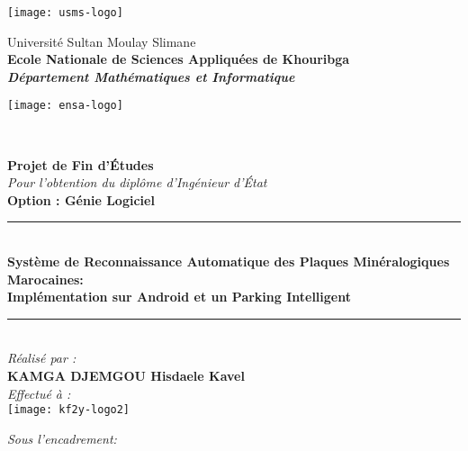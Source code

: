 \begin{titlepage}
\begin{minipage}{2cm}
	\begin{flushleft}
		\texttt{[image: usms-logo]}
	\end{flushleft}
\end{minipage}\hfill
\begin{minipage}{12cm}
	\begin{center}
		Université Sultan Moulay Slimane\\
		\textbf{Ecole Nationale de Sciences Appliquées de Khouribga}\\
		\textit{\textbf{Département Mathématiques et Informatique}}
	\end{center}
\end{minipage}\hfill
\begin{minipage}{2cm}
	\begin{flushright}
		\texttt{[image: ensa-logo]}
	\end{flushright}
\end{minipage}\\
\begin{center}
{\large \bfseries Projet de Fin d’Études}\\[0.5cm]
{\large \textit{Pour l'obtention du diplôme d'Ingénieur d'État}}\\[0.5cm]
{\large \bfseries{Option : Génie Logiciel} \\ }
\vspace{10mm}
\rule{0.95\textwidth}{2pt}\vspace{0.9\baselineskip}\\
			{\Large \textrm{\textbf{Système de Reconnaissance Automatique des Plaques Minéralogiques Marocaines: \\Implémentation sur Android et un Parking Intelligent}}}
\rule{0.95\textwidth}{2pt}\\
\vspace{10mm}
\emph{Réalisé par :}\\[0.5cm]
\large \textbf{\textsc{KAMGA DJEMGOU} Hisdaele Kavel}\\
\vspace{10mm}
\emph{Effectué à :}\\[0.5cm]
\texttt{[image: kf2y-logo2]}
\end{center}
\begin{center}
	\emph{Sous l'encadrement: }
\end{center}
\noindent
\begin{minipage}{0.4\textwidth}

\end{minipage}
\end{titlepage}
